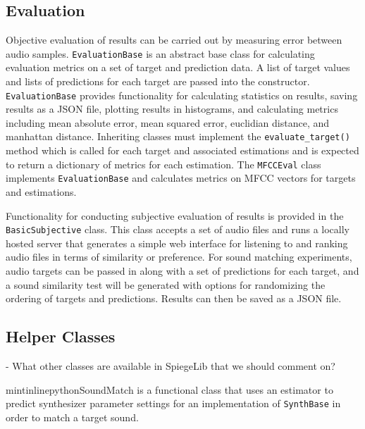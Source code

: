 \subsection{Evaluation}
Objective evaluation of results can be carried out by measuring error between audio samples. \texttt{EvaluationBase} is an abstract base class for calculating evaluation metrics on a set of target and prediction data. A list of target values and lists of predictions for each target are passed into the constructor. \texttt{EvaluationBase} provides functionality for calculating statistics on results, saving results as a JSON file, plotting results in histograms, and calculating metrics including mean absolute error, mean squared error, euclidian distance, and manhattan distance. Inheriting classes must implement the \texttt{evaluate_target()} method which is called for each target and associated estimations and is expected to return a dictionary of metrics for each estimation. The \texttt{MFCCEval} class implements \texttt{EvaluationBase} and calculates metrics on MFCC vectors for targets and estimations.

Functionality for conducting subjective evaluation of results is provided in the \texttt{BasicSubjective} class. This class accepts a set of audio files and runs a locally hosted server that generates a simple web interface for listening to and ranking audio files in terms of similarity or preference. For sound matching experiments, audio targets can be passed in along with a set of predictions for each target, and a sound similarity test will be generated with options for randomizing the ordering of targets and predictions. Results can then be saved as a JSON file.

\subsection{Helper Classes}
- What other classes are available in SpiegeLib that we should comment on?

mintinline{python}{SoundMatch} is a functional class that uses an estimator to predict synthesizer parameter settings for an implementation of \texttt{SynthBase} in order to match a target sound.


